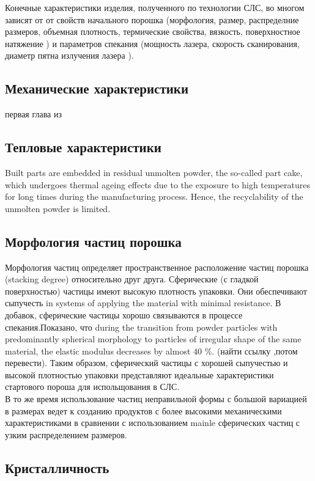 Конечные характеристики изделия, полученного по технологии СЛС, во многом зависят от от свойств начального порошка (морфология, размер, распределние размеров, объемная плотность, термические свойства, вязкость, поверхностное натяжение )  и параметров спекания (мощность лазера, скорость сканирования, диаметр пятна излучения лазера ).

\subsection{Механические характеристики}
первая глава из
\cite{termopols}
\subsection{Тепловые характеристики}

Built parts are embedded in residual unmolten powder, the so-called part cake, which undergoes
thermal ageing effects due to the exposure to high temperatures for long times during the manufacturing process. Hence, the
recyclability of the unmolten powder is limited. \cite{ageing}


\subsection{Морфология частиц порошка}
Морфология частиц определяет пространственное расположение частиц порошка (stacking degree) относительно друг друга. Сферические (с гладкой поверхностью) частицы имеют высокую плотность упаковки. Они обеспечивают  сыпучесть in systems of applying the material with minimal resistance. В добавок, сферические частицы хорошо связываются в процессе спекания.Показано, что 
during the transition from powder particles with predominantly spherical morphology to particles of irregular shape of the same material, the elastic modulus decreases by almost 40 \%. 
(найти ссылку ,потом перевести).
Таким образом, сферический частицы с хорошей сыпучестью и высокой плотностью упаковки представляют идеальные характеристики стартового пороша для испольщования в СЛС.\\
В то же время использование частиц неправильной формы с большой вариацией в размерах ведет к созданию продуктов с более высокими механическими характеристиками в сравнении с использованием mainle сферических частиц с узким распределением размеров.

\subsection{Кристалличность}

